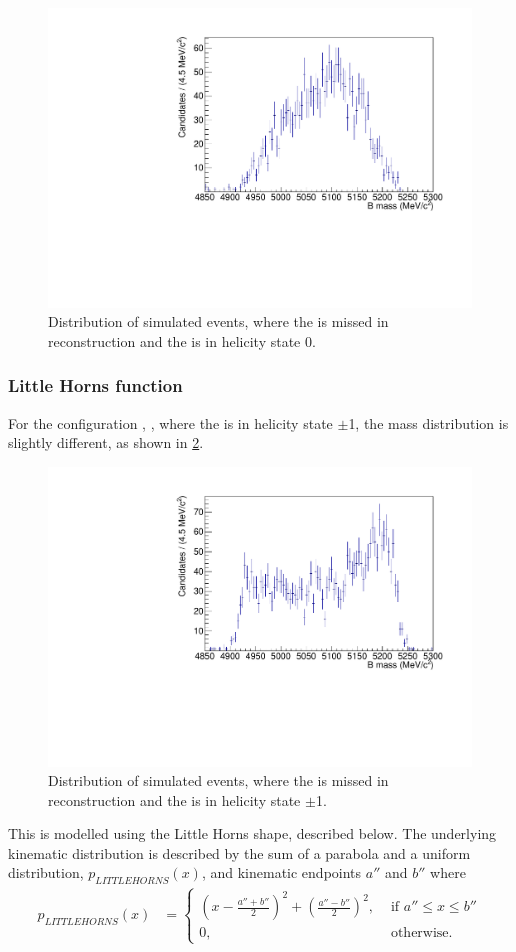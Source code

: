 \begin{figure}[h]
\centering
\includegraphics[width=0.5\linewidth]{figures/fitComponents/hill.pdf}
\caption{Distribution of simulated \decay{\Bm}{(\decay{\Dstarz}{\Dz\gamma})\Kstarm} events, where the \Pgamma is missed in reconstruction and the \Dstarz is in helicity state 0.}
\label{fig:hill}
\end{figure}

\subsubsection{Little Horns function}

For the configuration \decay{\Bm}{\Dstarz\Kstarm}, \decay{\Dstarz}{\Dz\gamma}, where the \Dstarz is in helicity state $\pm$1, the \Bm mass distribution is slightly different, as shown in \fig\ref{fig:littlehorns}.

\begin{figure}[h]
\centering
\includegraphics[width=0.5\linewidth]{figures/fitComponents/littlehorns.pdf}
\caption{Distribution of simulated \decay{\Bm}{(\decay{\Dstarz}{\Dz\gamma})\Kstarm} events, where the \Pgamma is missed in reconstruction and the \Dstarz is in helicity state $\pm$1.}
\label{fig:littlehorns}
\end{figure}

This is modelled using the Little Horns shape, described below. The underlying kinematic distribution is described by the sum of a parabola and a uniform distribution, $p_{LITTLEHORNS}(x)$, and kinematic endpoints $a''$ and $b''$ where
\begin{align}
p_{LITTLEHORNS}(x) &= \begin{cases}
\left(x - \frac{a''+b''}{2}\right)^2 + \left(\frac{a''-b''}{2}\right)^2, & \text{ if $a'' \leq x \leq b''$}\\ 	
0, & \text{ otherwise.}
\end{cases} 
\end{align}

